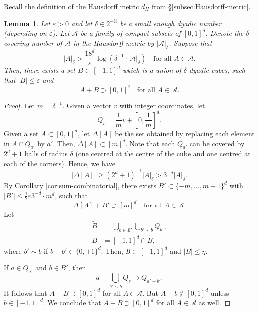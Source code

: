 \documentclass[12pt]{amsart}
\newcommand{\e}{\varepsilon}
\newtheorem{lemma}[theorem]{Lemma}
\def\N{{\mathbb{N}}}
\numberwithin{theorem}{section}
\numberwithin{equation}{section}
\begin{document}
Recall the definition of the Hausdorff metric $d_H$ from \S\ref{subsec:Hausdorff-metric}.
\begin{lemma} \label{lem:discrete-to-continuous}
    Let $\e>0$ and let $\delta\in 2^{-\N}$ be a small enough dyadic number (depending on $\e$). Let $\mathcal{A}$ be a family of compact subsets of $[0,1]^d$.  Denote the $\delta$-covering number of $\mathcal{A}$ in the Hausdorff metric by $|\mathcal{A}|_{\delta}$. Suppose that
    \[
        |A|_{\delta}> \frac{18^d}{\e}\log\left(\delta^{-1}\cdot|\mathcal{A}|_{\delta}\right) \quad\text{for all }A\in\mathcal{A}.
    \]
    Then, there exists a set $B\subset [-1,1]^d$ which is a union of $\delta$-dyadic cubes, such that $|B|\le \e$ and
    \[
        A+B \supset [0,1]^d \quad\text{for all }A\in\mathcal{A}.
    \]
\end{lemma}
\begin{proof}
    Let $m=\delta^{-1}$. Given a vector $v$ with integer coordinates, let
    \begin{equation} \label{eq:Qv}
        Q_v = \frac{1}{m}v + \left[0,\frac{1}{m} \right]^d.
    \end{equation}
    Given a set $A\subset [0,1]^d$, let $\Delta[A]$ be the set obtained by replacing each element in $A\cap Q_{a'}$ by $a'$. Then, $\Delta[A]\subset [m]^d$. Note that each $Q_{a'}$ can be covered by $2^d+1$ balls of radius $\delta$ (one centred at the centre of the cube and one centred at each of the corners). Hence, we have
    \[
        |\Delta[A]| \ge (2^d+1)^{-1} |A|_{\delta}> 3^{-d}|A|_{\delta}.
    \]
    By Corollary \ref{cor:sum-combinatorial}, there exists $B'\subset \{ -m,\ldots, m-1\}^d$ with $|B'|\le \tfrac{1}{2}\e 3^{-d}\cdot m^d$, such that
    \[
        \Delta[A]+B' \supset [m]^d \quad\text{for all } A\in\mathcal{A}.
    \]
    Let
    \begin{equation*}
        \begin{split}
        \tilde{B} &=  \bigcup_{b\in B'} \bigcup_{b'\sim b} Q_{b'},\\
        B &= [-1,1]^d\cap \tilde{B},
        \end{split}
    \end{equation*}
    where $b'\sim b$ if $b-b'\in \{0,\pm 1\}^d$. Then, $B\subset [-1,1]^d$ and $|B|\le \eta$.

    If $a\in Q_{a'}$ and $b\in B'$, then
    \[
        a+\bigcup_{b'\sim b} Q_{b'} \supset Q_{a'+b'}.
    \]
    It follows that $A+\tilde{B}\supset [0,1]^d$ for all $A\in\mathcal{A}$. But $A+b\notin [0,1]^d$ unless $b\in [-1,1]^d$. We conclude that $A+B\supset [0,1]^d$ for all $A\in\mathcal{A}$ as well.
\end{proof}
\end{document}

